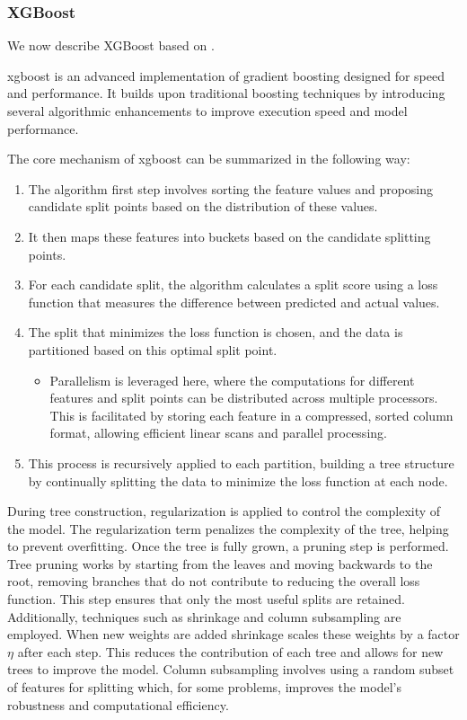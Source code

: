 \subsubsection{XGBoost}
We now describe XGBoost based on \citet{ChenGuestrin2016}.

\gls{xgboost} is an advanced implementation of gradient boosting designed for speed and performance. 
It builds upon traditional boosting techniques by introducing several algorithmic enhancements to improve execution speed and model performance.

The core mechanism of \gls{xgboost} can be summarized in the following way:
\begin{enumerate}
\item The algorithm first step involves sorting the feature values and proposing candidate split points based on the distribution of these values.
\item It then maps these features into buckets based on the candidate splitting points.
\item For each candidate split, the algorithm calculates a split score using a loss function that measures the difference between predicted and actual values.
\item The split that minimizes the loss function is chosen, and the data is partitioned based on this optimal split point. 
	\begin{itemize}
		\item Parallelism is leveraged here, where the computations for different features and split points can be distributed across multiple processors. 
		This is facilitated by storing each feature in a compressed, sorted column format, allowing efficient linear scans and parallel processing.
	\end{itemize}
\item This process is recursively applied to each partition, building a tree structure by continually splitting the data to minimize the loss function at each node.
\end{enumerate}
During tree construction, regularization is applied to control the complexity of the model. 
The regularization term penalizes the complexity of the tree, helping to prevent overfitting.
Once the tree is fully grown, a pruning step is performed. 
Tree pruning works by starting from the leaves and moving backwards to the root, removing branches that do not contribute to reducing the overall loss function. 
This step ensures that only the most useful splits are retained.
Additionally, techniques such as shrinkage and column subsampling are employed. 
When new weights are added shrinkage scales these weights by a factor $\eta$ after each step.
This reduces the contribution of each tree and allows for new trees to improve the model.
Column subsampling involves using a random subset of features for splitting which, for some problems, improves the model's robustness and computational efficiency.
